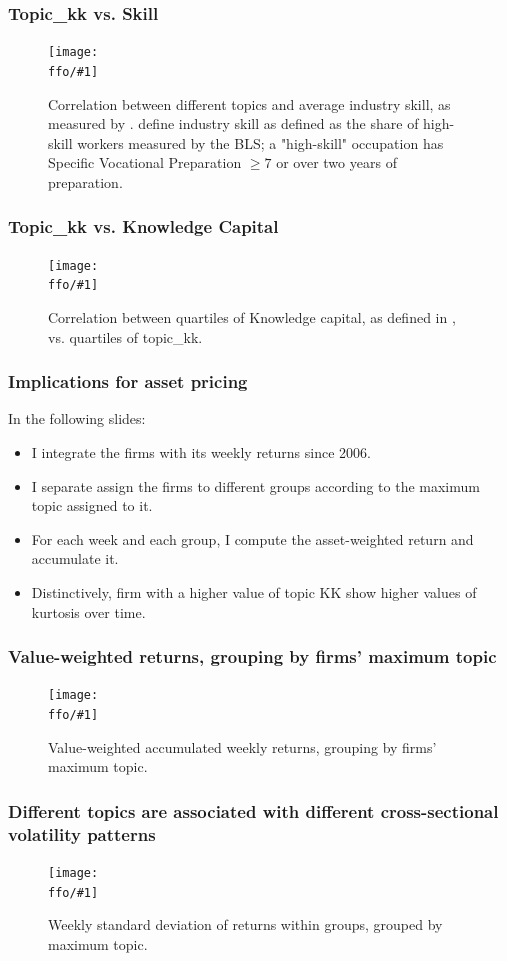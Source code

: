 \documentclass{beamer}
\newcommand{\ffo}{dicfullmc10thr10defnob40noa1_4t}
\newcommand{\insertfigure}[2]{
\begin{figure}[h!]
  \centering
  \texttt{[image: \\ffo/\#1]}
  \centering
  \captionsetup{font=scriptsize}
  \caption{#2}
  \label{fig:#1}
\end{figure}
}
\begin{document}
\begin{frame}
\frametitle{Topic\_kk vs. Skill}
\scriptsize
\insertfigure{heatmap}{Correlation between different topics and average industry skill, as measured by \cite{Belo2017-qi}. \cite{Belo2017-qi} define industry skill as defined as the share of high-skill workers measured by the BLS; a "high-skill" occupation has Specific Vocational Preparation $\geq 7$ or over two years of preparation.} 
\end{frame}

\begin{frame}
\frametitle{Topic\_kk vs. Knowledge Capital}
\scriptsize
\insertfigure{topicvskkpt_hm}{Correlation between quartiles of Knowledge capital,  as defined in \cite{Peters2017-fl}, vs. quartiles of topic\_kk.}
\end{frame}

\begin{frame}
  \frametitle{Implications for asset pricing}
In the following slides:
\begin{itemize}
	\item I integrate the firms with its weekly returns since 2006.
	\item I separate assign the firms to different groups according to the maximum topic assigned to it.
	\item For each week and each group, I compute the asset-weighted return and accumulate it.
	\item  Distinctively, firm with a higher value of topic KK show higher values of kurtosis over time.
\end{itemize}
\end{frame}

\begin{frame}
\frametitle{Value-weighted returns, grouping by firms' maximum topic}
\insertfigure{awawr_byg}{Value-weighted accumulated weekly returns, grouping by firms' maximum topic.}
\end{frame}

\begin{frame}
\frametitle{Different topics are associated with different cross-sectional volatility patterns}
\insertfigure{wsdr_byg}{Weekly standard deviation of returns within groups, grouped by maximum topic.}
\end{frame}
\end{document}
